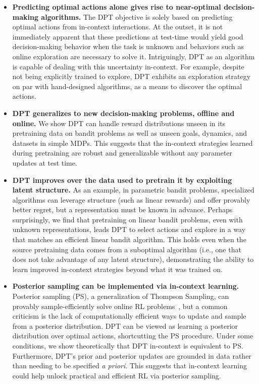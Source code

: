 \documentclass{article}
\newcommand{\macroName}{DPT}
\begin{document}
\begin{itemize}[leftmargin=1em]
\item \textbf{Predicting optimal actions alone gives rise to near-optimal decision-making algorithms.}
The DPT objective is solely based on predicting optimal actions from in-context interactions. At the outset, it is not immediately apparent that these predictions at test-time would yield good decision-making behavior when the task is unknown and behaviors such as
online exploration are necessary to solve it.
Intriguingly, DPT as an algorithm is capable of dealing with this uncertainty in-context. For example, despite not being explicitly trained to explore, DPT exhibits an exploration strategy on par with hand-designed algorithms, as a means to discover the optimal actions.
\item \textbf{DPT generalizes to new decision-making problems, offline and online.} We show DPT can handle reward distributions unseen in its pretraining data on bandit problems as well as unseen goals, dynamics, and datasets in simple MDPs. This suggests that the in-context strategies learned during pretraining are robust and generalizable without any parameter updates at test time.
\item \textbf{\macroName{} improves over the data used to pretrain it by exploiting latent structure.}
As an example, in parametric bandit problems, specialized algorithms can leverage structure (such as linear rewards) and offer provably better regret, but a representation must be known in advance. Perhaps surprisingly, we find that pretraining on linear bandit problems, even with unknown representations, leads DPT to select actions and explore in a way that matches an efficient linear bandit algorithm. This holds even when the source pretraining data comes from a suboptimal algorithm (i.e., one that does not take advantage of any latent structure), demonstrating the ability to learn improved in-context strategies beyond what it was trained on.
\item \textbf{Posterior sampling can be implemented via in-context learning.}
Posterior sampling (PS), a generalization of Thompson Sampling, can provably sample-efficiently solve online RL problems~\citep{osband2013more}, but a common criticism is the lack of computationally efficient ways to update and sample from a posterior distribution. \macroName{} can be viewed as learning a posterior distribution over optimal actions, shortcutting the PS procedure. Under some conditions, we show theoretically that \macroName{}  in-context is equivalent to PS. Furthermore, \macroName{}'s prior and posterior updates are grounded in data rather than needing to be specified \textit{a priori}. This suggests that in-context learning could help unlock practical and efficient RL via posterior sampling.
\end{itemize}
\end{document}
